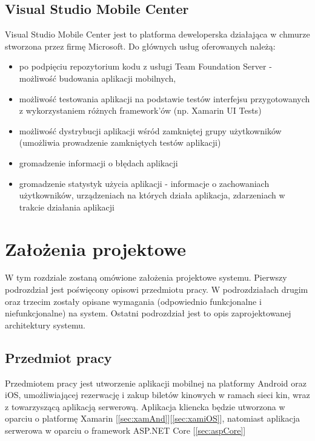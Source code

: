 \section{Visual Studio Mobile Center}
\label{sec:hockeyapp}
Visual Studio Mobile Center jest to platforma deweloperska działająca w chmurze stworzona przez firmę Microsoft. Do głównych usług oferowanych należą:
\begin{itemize}
\item po podpięciu repozytorium kodu z usługi Team Foundation Server - możliwość budowania aplikacji mobilnych,
\item możliwość testowania aplikacji na podstawie testów interfejsu przygotowanych z wykorzystaniem różnych framework'ów (np. Xamarin UI Tests)
\item możliwość dystrybucji aplikacji wśród zamkniętej grupy użytkowników (umożliwia prowadzenie zamkniętych testów aplikacji)
\item gromadzenie informacji o błędach aplikacji
\item gromadzenie statystyk użycia aplikacji - informacje o zachowaniach użytkowników, urządzeniach na których działa aplikacja, zdarzeniach w trakcie działania aplikacji
\end{itemize}
\chapter{Założenia projektowe}
W tym rozdziale zostaną omówione założenia projektowe systemu. Pierwszy podrozdział jest poświęcony opisowi przedmiotu pracy. W podrozdziałach drugim oraz trzecim zostały opisane wymagania (odpowiednio funkcjonalne i niefunkcjonalne) na system. Ostatni podrozdział jest to opis zaprojektowanej architektury systemu.
\section{Przedmiot pracy}
Przedmiotem pracy jest utworzenie aplikacji mobilnej na platformy Android oraz iOS, umożliwiającej rezerwację i zakup biletów kinowych w ramach sieci kin, wraz z towarzyszącą aplikacją serwerową. Aplikacja kliencka będzie utworzona w oparciu o platformę Xamarin [\ref{sec:xamAnd}][\ref{sec:xamiOS}], natomiast aplikacja serwerowa w oparciu o framework ASP.NET Core [\ref{sec:aspCore}]

